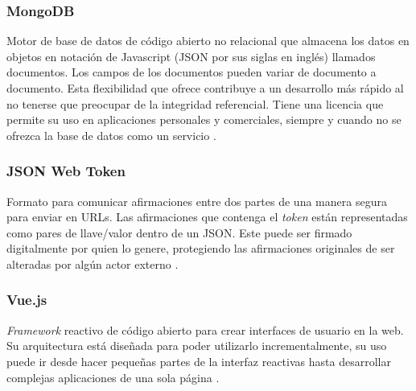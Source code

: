 \subsubsection{MongoDB}
Motor de base de datos de código abierto no relacional que almacena los datos en objetos en notación de Javascript (JSON por sus siglas en inglés) llamados documentos. Los campos de los documentos pueden variar de documento a documento. Esta flexibilidad que ofrece contribuye a un desarrollo más rápido al no tenerse que preocupar de la integridad referencial. Tiene una licencia que permite su uso en aplicaciones personales y comerciales, siempre y cuando no se ofrezca la base de datos como un servicio \cite{what_is_mongo}.

\subsubsection{JSON Web Token}
Formato para comunicar afirmaciones entre dos partes de una manera segura para enviar en URLs. Las afirmaciones que contenga el \textit{token} están representadas como pares de llave/valor dentro de un JSON. Este puede ser firmado digitalmente por quien lo genere, protegiendo las afirmaciones originales de ser alteradas por algún actor externo \cite{jwt}.

\subsubsection{Vue.js}
\textit{Framework} reactivo de código abierto para crear interfaces de usuario en la web. Su arquitectura está diseñada para poder utilizarlo incrementalmente, su uso puede ir desde hacer pequeñas partes de la interfaz reactivas hasta desarrollar complejas aplicaciones de una sola página \cite{vuejs}. 





